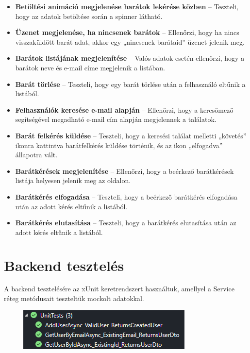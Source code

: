 \documentclass[12pt]{report}
\begin{document}
\begin{itemize}
  \item \textbf{Betöltési animáció megjelenése barátok lekérése közben} – Teszteli, hogy az adatok betöltése során a spinner látható.
  \item \textbf{Üzenet megjelenése, ha nincsenek barátok} – Ellenőrzi, hogy ha nincs visszaküldött barát adat, akkor egy „nincsenek barátaid” üzenet jelenik meg.
  \item \textbf{Barátok listájának megjelenítése} – Valós adatok esetén ellenőrzi, hogy a barátok neve és e-mail címe megjelenik a listában.
  \item \textbf{Barát törlése} – Teszteli, hogy egy barát törlése után a felhasználó eltűnik a listából.
  \item \textbf{Felhasználók keresése e-mail alapján} – Ellenőrzi, hogy a keresőmező segítségével megadható e-mail cím alapján megjelennek a találatok.
  \item \textbf{Barát felkérés küldése} – Teszteli, hogy a keresési találat melletti „követés” ikonra kattintva barátfelkérés küldése történik, és az ikon „elfogadva” állapotra vált.
  \item \textbf{Barátkérések megjelenítése} – Ellenőrzi, hogy a beérkező barátkérések listája helyesen jelenik meg az oldalon.
  \item \textbf{Barátkérés elfogadása} – Teszteli, hogy a beérkező barátkérés elfogadása után az adott kérés eltűnik a listából.
  \item \textbf{Barátkérés elutasítása} – Teszteli, hogy a barátkérés elutasítása után az adott kérés eltűnik a listából.
\end{itemize}

\section{Backend tesztelés}
A backend tesztelésére az xUnit keretrendszert használtuk, amellyel a Service réteg metódusait teszteltük mockolt adatokkal. 
\begin{figure}[H]
  \centering
  \begin{minipage}[b]{0.6\textwidth}
      \centering
      \includegraphics[width=\linewidth]{src/unittests.png}
  \end{minipage}
\end{figure}
\end{document}
